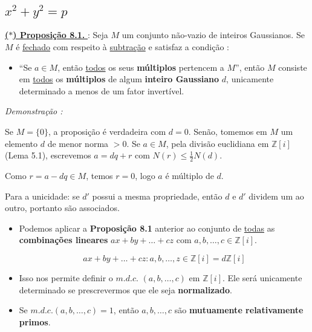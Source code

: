 \subsection{\texorpdfstring{$x^2 + y^2 = p$}{x² + y² = p}}

    \underline{\underline{ \textbf{\textcolor{cinzaEscuro}{($\ast$) Proposição 8.1.}} }} : 
    Seja $M$ um conjunto não-vazio de inteiros Gaussianos.  
    Se $M$ é \underline{fechado} com respeito à \underline{subtração} e satisfaz a condição :  

    \begin{itemize}[left=0.5cm, align=left, nosep]
        \item “Se $a \in M$, então \underline{todos} os seus \textbf{múltiplos} pertencem a $M$”,  
        então $M$ consiste em \underline{todos} os \textbf{múltiplos} de algum \textbf{inteiro Gaussiano} $d$, unicamente determinado a menos de um fator invertível.
    \end{itemize}

    \textit{Demonstração : }

    Se $M=\{0\}$, a proposição é verdadeira com $d=0$.  
    Senão, tomemos em $M$ um elemento $d$ de menor norma $>0$.  
    Se $a\in M$, pela divisão euclidiana em $\mathbb{Z}[i]$ (Lema 5.1), 
    escrevemos $a = dq + r$ com $N(r) \leq \tfrac{1}{2}N(d)$.  

    Como $r = a - dq \in M$, temos $r=0$, logo $a$ é múltiplo de $d$.  

    Para a unicidade: se $d'$ possui a mesma propriedade, então $d$ e $d'$ dividem um ao outro, 
    portanto são associados.

    \begin{itemize}[left=0.5cm, align=left, nosep]
        \item Podemos aplicar a \textbf{Proposição 8.1} anterior ao conjunto de \underline{todas} as \textbf{combinações lineares} 
        $ax + by + \ldots + cz$ com $a,b,\dots,c \in \mathbb{Z}[i]$.  
        
        \[
        ax+ by + \ldots + cz : a,b,\ldots,z \in \mathbb{Z}[i] = d\mathbb{Z}[i]
        \]

        \item Isso nos permite definir o $m.d.c.$ $(a,b,\ldots,c)$ em $\mathbb{Z}[i]$.  
        Ele será unicamente determinado se prescrevermos que ele seja \textbf{normalizado}.

        \item Se $m.d.c.(a,b,\ldots,c) = 1$, então $a, b, \ldots , c$ são \textbf{mutuamente relativamente primos}.
    \end{itemize}

